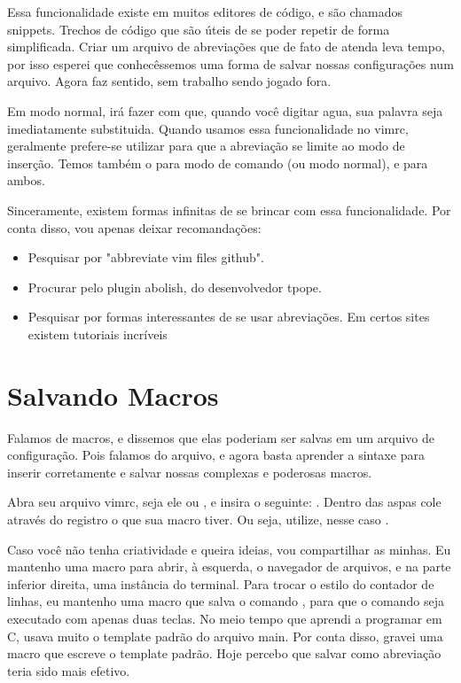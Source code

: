 Essa funcionalidade existe em muitos editores de código, e são chamados snippets.
Trechos de código que são úteis de se poder repetir de forma simplificada.
Criar um arquivo de abreviações que de fato de atenda leva tempo, por isso esperei que conhecêssemos uma forma
de salvar nossas configurações num arquivo.
Agora faz sentido, sem trabalho sendo jogado fora.

Em modo normal,  irá fazer com que, quando você digitar agua, sua palavra seja imediatamente substituida.
Quando usamos essa funcionalidade no vimrc, geralmente prefere-se utilizar 
para que a abreviação se limite ao modo de inserção.
Temos também o  para modo de comando (ou modo normal), e  para ambos.

Sinceramente, existem formas infinitas de se brincar com essa funcionalidade.
Por conta disso, vou apenas deixar recomandações:
\begin{itemize}
	\item Pesquisar por "abbreviate vim files github".
	\item Procurar pelo plugin abolish, do desenvolvedor tpope.
	\item Pesquisar por formas interessantes de se usar abreviações. Em certos sites existem tutoriais incríveis
\end{itemize}

\section{Salvando Macros}
Falamos de macros, e dissemos que elas poderiam ser salvas em um arquivo de configuração.
Pois falamos do arquivo, e agora basta aprender a sintaxe para inserir corretamente e salvar nossas complexas e poderosas macros.

Abra seu arquivo vimrc, seja ele  ou , e insira o seguinte:
.
Dentro das aspas cole através do registro o que sua macro tiver.
Ou seja, utilize, nesse caso .

Caso você não tenha criatividade e queira ideias, vou compartilhar as minhas.
Eu mantenho uma macro para abrir, à esquerda,
o navegador de arquivos, e na parte inferior direita, uma instância do terminal.
Para trocar o estilo do contador de linhas, eu mantenho uma macro que salva o comando
, para que o comando seja executado com apenas duas teclas.
No meio tempo que aprendi a programar em C, usava muito o template padrão do arquivo main.
Por conta disso, gravei uma macro que escreve o template padrão.
Hoje percebo que salvar como abreviação teria sido mais efetivo.

